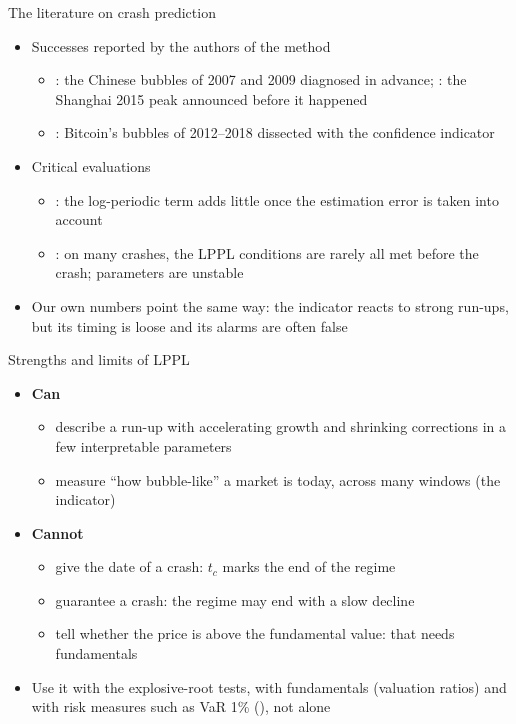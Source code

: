 \begin{frame}{The literature on crash prediction}
\itemsize{\small}
\begin{itemize}
    \item Successes reported by the authors of the method
    \begin{itemize}
        \item {}: the Chinese bubbles of 2007 and 2009 diagnosed in advance; : the Shanghai 2015 peak announced before it happened
        \item {}: Bitcoin's bubbles of 2012--2018 dissected with the confidence indicator
    \end{itemize}
    \item Critical evaluations
    \begin{itemize}
        \item {}: the log-periodic term adds little once the estimation error is taken into account
        \item {}: on many crashes, the LPPL conditions are rarely all met before the crash; parameters are unstable
    \end{itemize}
    \item Our own numbers point the same way: the indicator reacts to strong run-ups, but its timing is loose and its alarms are often false
\end{itemize}
\end{frame}

\begin{frame}{Strengths and limits of LPPL}
\itemsize{\small}
\begin{itemize}
    \item \textbf{Can}
    \begin{itemize}
        \item describe a run-up with accelerating growth and shrinking corrections in a few interpretable parameters
        \item measure ``how bubble-like'' a market is today, across many windows (the indicator)
    \end{itemize}
    \item \textbf{Cannot}
    \begin{itemize}
        \item give the date of a crash: $t_c$ marks the end of the regime
        \item guarantee a crash: the regime may end with a slow decline
        \item tell whether the price is above the fundamental value: that needs fundamentals
    \end{itemize}
    \item Use it with the explosive-root tests, with fundamentals (valuation ratios) and with risk measures such as VaR 1\% (), not alone
\end{itemize}
\end{frame}

